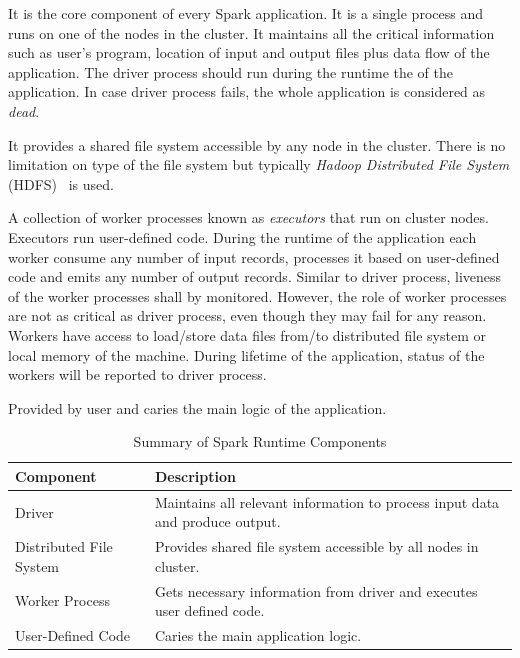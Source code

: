 \begin{description}[leftmargin=0pt]
    \item[Driver Process] It is the core component of every Spark application. It is a single process and runs on one of the nodes in the cluster. It maintains all the critical information such as user's program, location of input and output files plus data flow of the application. The driver process should run during the runtime the of the application. In case driver process fails, the whole application is considered as \emph{dead}.
    \item[Distributed File System] It provides a shared file system accessible by any node in the cluster. There is no limitation on type of the file system but typically \emph{Hadoop Distributed File System} (HDFS)~\cite{hadoop} is used.
    \item[Worker Processes] A collection of worker processes known as \emph{executors} that run on cluster nodes. Executors run user-defined code. During the runtime of the application each worker consume any number of input records, processes it based on user-defined code and emits any number of output records. Similar to driver process, liveness of the worker processes shall by monitored. However, the role of worker processes are not as critical as driver process, even though they may fail for any reason. Workers have access to load/store data files from/to distributed file system or local memory of the machine. During lifetime of the application, status of the workers will be reported to driver process.
    \item[User-Defined Code] Provided by user and caries the main logic of the application.
\end{description}
\begin{table}[!htbp]
    \begin{tabularx}{\textwidth}{lX}
        \toprule
        \textbf{Component} & \textbf{Description}\\
        \midrule
        Driver & Maintains all relevant information to process input data and produce output.\\
        Distributed File System & Provides shared file system accessible by all nodes in cluster.\\
        Worker Process & Gets necessary information from driver and executes user defined code.\\
        User-Defined Code & Caries the main application logic.\\
        \bottomrule
    \end{tabularx}
    \centering
    \caption{Summary of Spark Runtime Components}
    \label{tab:spark-runtime}
\end{table}

